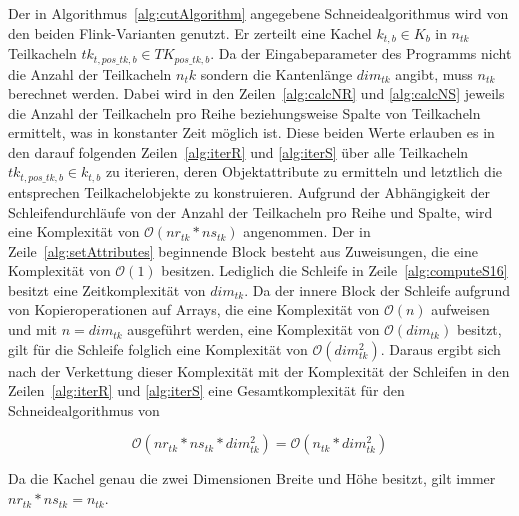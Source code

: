 Der in Algorithmus~\ref{alg:cutAlgorithm} angegebene Schneidealgorithmus wird von den beiden Flink-Varianten genutzt. Er zerteilt eine Kachel $k_{t, b} \in K_{b}$ in $n_{tk}$ Teilkacheln $tk_{t, pos\_tk, b} \in TK_{pos\_tk, b}$. Da der Eingabeparameter des Programms nicht die Anzahl der Teilkacheln $n_tk$ sondern die Kantenlänge $dim_{tk}$ angibt, muss $n_{tk}$ berechnet werden. Dabei wird in den Zeilen~\ref{alg:calcNR} und \ref{alg:calcNS} jeweils die Anzahl der Teilkacheln pro Reihe beziehungsweise Spalte von Teilkacheln ermittelt, was in konstanter Zeit möglich ist. Diese beiden Werte erlauben es in den darauf folgenden Zeilen~\ref{alg:iterR} und \ref{alg:iterS} über alle Teilkacheln $tk_{t, pos\_tk, b} \in k_{t, b}$ zu iterieren, deren Objektattribute zu ermitteln und letztlich die entsprechen Teilkachelobjekte zu konstruieren. Aufgrund der Abhängigkeit der Schleifendurchläufe von der Anzahl der Teilkacheln pro Reihe und Spalte, wird eine Komplexität von $\mathcal{O}(nr_{tk} * ns_{tk})$ angenommen. Der in Zeile~\ref{alg:setAttributes} beginnende Block besteht aus Zuweisungen, die eine Komplexität von $\mathcal{O}(1)$ besitzen. Lediglich die Schleife in Zeile~\ref{alg:computeS16} besitzt eine Zeitkomplexität von $dim_{tk}$. Da der innere Block der Schleife aufgrund von Kopieroperationen auf Arrays, die eine Komplexität von $\mathcal{O}(n)$ aufweisen und mit $n = dim_{tk}$ ausgeführt werden, eine Komplexität von $\mathcal{O}(dim_{tk})$ besitzt, gilt für die Schleife folglich eine Komplexität von $\mathcal{O}(dim_{tk}^2)$. Daraus ergibt sich nach der Verkettung dieser Komplexität mit der Komplexität der Schleifen in den Zeilen~\ref{alg:iterR} und \ref{alg:iterS} eine Gesamtkomplexität für den Schneidealgorithmus von 

\begin{equation} \label{eq:complexityCut}
\mathcal{O}(nr_{tk} * ns_{tk} * dim_{tk}^2) = \mathcal{O}(n_{tk} * dim_{tk}^2)
\end{equation}

Da die Kachel genau die zwei Dimensionen Breite und Höhe besitzt, gilt immer $nr_{tk} * ns_{tk} = n_{tk}$. 

